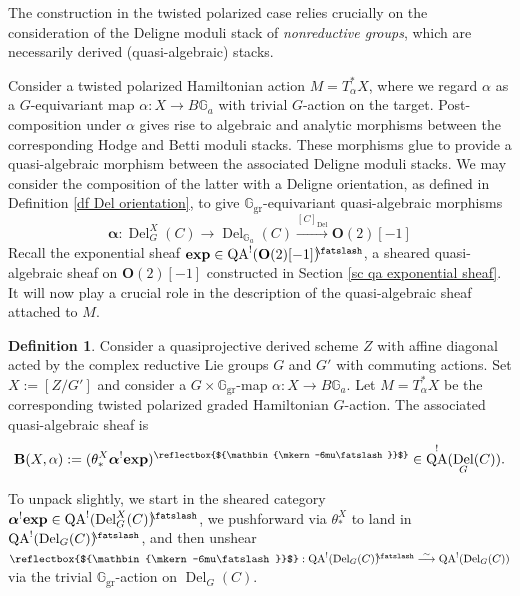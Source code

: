 \documentclass[11pt, a4paper]{amsart}
\numberwithin{equation}{section}
\theoremstyle{definition}
\newtheorem{definition}[theorem]{Definition}
\theoremstyle{remark}
\DeclareMathOperator{\Del}{Del}
\DeclareMathOperator{\QA}{QA}
\newcommand{\shear}{{\mathbin{\mkern-6mu\fatslash}}}
\DeclareRobustCommand{\unshear}{\text{\reflectbox{$\shear$}}}
\newcommand{\Ggr}{\mathbb{G}_{\mathrm{gr}}}
\newcommand{\bB}{\mathbf{B}}
\newcommand{\GG}{\mathbb{G}}
\renewcommand{\to}{\longrightarrow}
\begin{document}
The construction in the twisted polarized case relies crucially on the consideration of the Deligne moduli stack of \textit{nonreductive groups}, which are necessarily derived (quasi-algebraic) stacks. 

Consider a twisted polarized Hamiltonian action $M = T^*_\alpha X$, where we regard $\alpha$ as a $G$-equivariant map $\alpha: X \to B\GG_a$ with trivial $G$-action on the target. Post-composition under $\alpha$ gives rise to algebraic and analytic morphisms between the corresponding Hodge and Betti moduli stacks. These morphisms glue to provide a quasi-algebraic morphism between the associated Deligne moduli stacks. We may consider the composition of the latter with a Deligne orientation, as defined in Definition \ref{df Del orientation}, to give $\Ggr$-equivariant quasi-algebraic morphisms
\begin{equation} \label{eq def bf alpha}
    \boldsymbol{\alpha}: \Del_G^X(C) \to \Del_{\GG_a}(C) \overset{[C]_{\Del}}{\to} \mathbf{O}(2)[-1]
\end{equation}
Recall the exponential sheaf $\mathbf{exp} \in \QA^!(\mathbf{O}(2)[-1])^\shear$, a sheared quasi-algebraic sheaf on $\mathbf{O}(2)[-1]$ constructed in Section \ref{sc qa exponential sheaf}. It will now play a crucial role in the description of the quasi-algebraic sheaf attached to $M$.

\begin{definition}
Consider a quasiprojective derived scheme $Z$ with affine diagonal acted by the complex reductive Lie groups $G$ and $G'$ with commuting actions. Set $X := [Z/G']$ and consider a $G \times \Ggr$-map $\alpha : X \to B \GG_a$. Let $M = T^*_\alpha X$ be the corresponding twisted polarized graded Hamiltonian $G$-action. The associated quasi-algebraic sheaf is 
    \begin{equation}
        \bB(X,\alpha) := (\theta_{*}^X\boldsymbol{\alpha}^!\mathbf{exp})^\unshear \in \QA^!(\Del_G(C)).
    \end{equation}
\end{definition}
To unpack slightly, we start in the sheared category $\boldsymbol{\alpha}^!\mathbf{exp} \in \QA^!(\Del_G^X(C))^\shear$, we pushforward via $\theta_{*}^X$ to land in $\QA^!(\Del_G(C))^\shear$, and then unshear $\unshear: \QA^!(\Del_G(C))^\shear \overset{\sim}{\to}\QA^!(\Del_G(C))$ via the trivial $\Ggr$-action on $\Del_{G}(C)$. 
\end{document}
